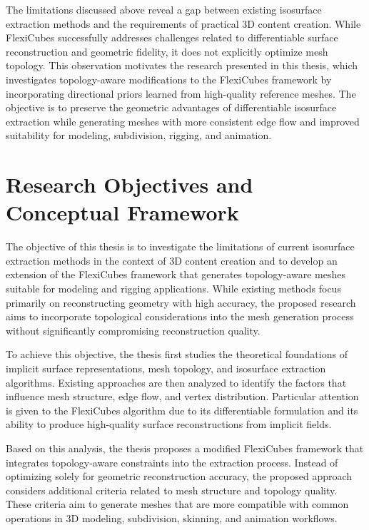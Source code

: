 \documentclass[../main.tex]{subfiles}
\begin{document}
The limitations discussed above reveal a gap between existing isosurface extraction methods and the requirements of practical 3D content creation. While FlexiCubes successfully addresses challenges related to differentiable surface reconstruction and geometric fidelity, it does not explicitly optimize mesh topology. This observation motivates the research presented in this thesis, which investigates topology-aware modifications to the FlexiCubes framework by incorporating directional priors learned from high-quality reference meshes. The objective is to preserve the geometric advantages of differentiable isosurface extraction while generating meshes with more consistent edge flow and improved suitability for modeling, subdivision, rigging, and animation.


\section{Research Objectives and Conceptual Framework}

The objective of this thesis is to investigate the limitations of current isosurface extraction methods in the context of 3D content creation and to develop an extension of the FlexiCubes framework that generates topology-aware meshes suitable for modeling and rigging applications. While existing methods focus primarily on reconstructing geometry with high accuracy, the proposed research aims to incorporate topological considerations into the mesh generation process without significantly compromising reconstruction quality.

To achieve this objective, the thesis first studies the theoretical foundations of implicit surface representations, mesh topology, and isosurface extraction algorithms. Existing approaches are then analyzed to identify the factors that influence mesh structure, edge flow, and vertex distribution. Particular attention is given to the FlexiCubes algorithm due to its differentiable formulation and its ability to produce high-quality surface reconstructions from implicit fields.

Based on this analysis, the thesis proposes a modified FlexiCubes framework that integrates topology-aware constraints into the extraction process. Instead of optimizing solely for geometric reconstruction accuracy, the proposed approach considers additional criteria related to mesh structure and topology quality. These criteria aim to generate meshes that are more compatible with common operations in 3D modeling, subdivision, skinning, and animation workflows.
\end{document}
